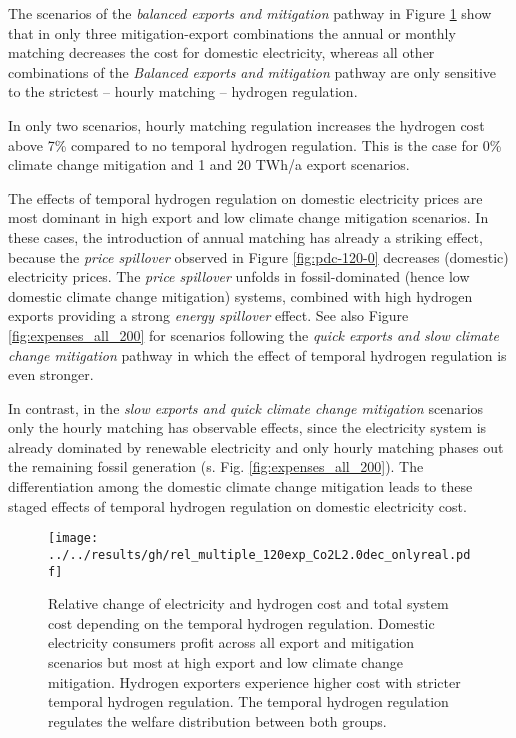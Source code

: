 The scenarios of the \textit{balanced exports and mitigation} pathway in Figure \ref{fig:expenses_real_120} show that in only three mitigation-export combinations the annual or monthly matching decreases the cost for domestic electricity, whereas all other combinations of the \textit{Balanced exports and mitigation} pathway are only sensitive to the strictest -- hourly matching -- hydrogen regulation. 

In only two scenarios, hourly matching regulation increases the hydrogen cost above 7\% compared to no temporal hydrogen regulation. This is the case for 0\% climate change mitigation and 1 and 20 TWh/a export scenarios.

The effects of temporal hydrogen regulation on domestic electricity prices are most dominant in high export and low climate change mitigation scenarios. 
In these cases, the introduction of annual matching has already a striking effect, because the \textit{price spillover} observed in Figure \ref{fig:pdc-120-0} decreases (domestic) electricity prices. The \textit{price spillover} unfolds in fossil-dominated (hence low domestic climate change mitigation) systems, combined with high hydrogen exports providing a strong \textit{energy spillover} effect.
See also Figure \ref{fig:expenses_all_200} for  scenarios following the \textit{quick exports and slow climate change mitigation} pathway in which the effect of temporal hydrogen regulation is even stronger.

In contrast, in the \textit{slow exports and quick climate change mitigation} scenarios only the hourly matching has observable effects, since the electricity system is already  dominated by renewable electricity and only hourly matching phases out the remaining fossil generation (s. Fig. \ref{fig:expenses_all_200}). The differentiation among the domestic climate change mitigation leads to these staged effects of temporal hydrogen regulation on domestic electricity cost.


\begin{figure}[h!]
    \centering
    \texttt{[image: ../../results/gh/rel\_multiple\_120exp\_Co2L2.0dec\_onlyreal.pdf]}
    \caption{Relative change of electricity and hydrogen cost and total system cost depending on the temporal hydrogen regulation. Domestic electricity consumers profit across all export and mitigation scenarios but most at high export and low climate change mitigation. Hydrogen exporters experience higher cost with stricter temporal hydrogen regulation. The temporal hydrogen regulation regulates the welfare distribution between both groups.}
    \label{fig:expenses_real_120}
\end{figure}
